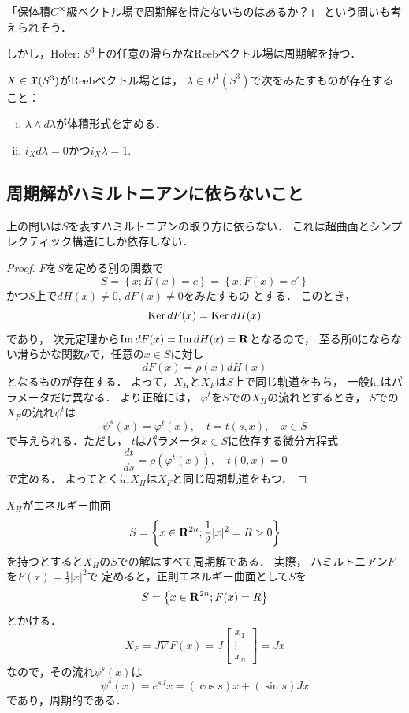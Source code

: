 「保体積\(C^\infty\)級ベクトル場で周期解を持たないものはあるか？」
という問いも考えられそう．

しかし，Hofer: \(S^3\)上の任意の滑らかなReebベクトル場は周期解を持つ．

\begin{DFN}
    \(X\in\mathfrak{X}(S^3)\)がReebベクトル場とは，
    \(\lambda\in\Omega^1(S^3)\)で次をみたすものが存在すること：
    \begin{enumerate}[(i)]
        \item \(\lambda\wedge d\lambda\)が体積形式を定める．
        \item \(i_{X}d\lambda=0\)かつ\(i_{X}\lambda=1.\)
    \end{enumerate}
\end{DFN}

\subsection*{周期解がハミルトニアンに依らないこと}

上の問いは\(S\)を表すハミルトニアンの取り方に依らない．
これは超曲面とシンプレクティック構造にしか依存しない．

\begin{proof}
    \(F\)を\(S\)を定める別の関数で
    \[
        S=
        \left\{x; H(x)=c\right\}
        =
        \left\{x; F(x)=c'\right\}
    \]
    かつ\(S\)上で\(dH(x)\ne0\), \(dF(x)\ne0\)をみたすもの
    とする．
    このとき，\[
        \mathop{\mathrm{Ker}}\nolimits{dF(x)}=\mathop{\mathrm{Ker}}\nolimits{dH(x)}
    \]であり，
    次元定理から\(\mathop{\mathrm{Im}}\nolimits{dF(x)}=\mathop{\mathrm{Im}}\nolimits{dH(x)}=\mathbf{R}\)となるので，
    至る所\(0\)にならない滑らかな関数\(\rho\)で，任意の\(x\in S\)に対し\[
        dF(x)=\rho(x)dH(x)
    \]となるものが存在する．
    よって，\(X_H\)と\(X_F\)は\(S\)上で同じ軌道をもち，
    一般にはパラメータだけ異なる．
    より正確には，
    \(\varphi^t\)を\(S\)での\(X_H\)の流れとするとき，
    \(S\)での\(X_F\)の流れ\(\psi^t\)は\[
        \psi^s(x)=\varphi^{t}(x),\quad
        t=t(s,x),
        \quad
        x\in S
    \]で与えられる．ただし，
    \(t\)はパラメータ\(x\in S\)に依存する微分方程式\[
        \frac{dt}{ds}=\rho\left(\varphi^t(x)\right),\quad
        t(0,x)=0
    \]で定める．
    よってとくに\(X_H\)は\(X_F\)と同じ周期軌道をもつ．
\end{proof}

\begin{EG*}
    \(X_H\)がエネルギー曲面\[
        S=\left\{x\in\mathbf{R}^{2n}; 
        \frac{1}{2}\lvert x\rvert^2=R>0
        \right\}
    \]を持つとすると\(X_H\)の\(S\)での解はすべて周期解である．
    実際，
    ハミルトニアン\(F\)を\(F(x)= \frac{1}{2}\lvert x\rvert^2\)で
    定めると，正則エネルギー曲面として\(S\)を
    \[
        S=\left\{x\in\mathbf{R}^{2n}; 
        F(x)=R
        \right\}
    \]とかける．
    \[
        X_F
        =J\nabla F(x)
        =J
        \begin{bmatrix}
            x_1\\
            \vdots\\
            x_n
        \end{bmatrix}
        =Jx
    \]
    なので，その流れ\(\psi^s(x)\)は
    \[
        \psi^s(x)=
        e^{sJ}x
        =(\cos{s})x+(\sin{s})Jx
    \]
    であり，周期的である．
\end{EG*}


